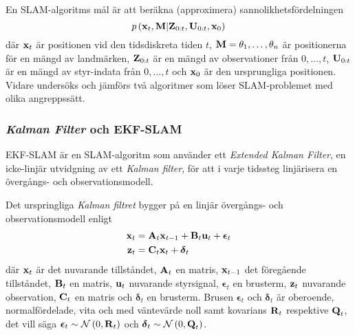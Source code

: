 \documentclass[11pt]{article}
\newcommand{\bfr}[1]{\textbf{\textrm{{#1}}}}
\begin{document}
\begin{flushleft}
En SLAM-algoritms mål är att beräkna (approximera) sannolikhetsfördelningen
\begin{equation*}
	p\left(\textbf{\textrm{x}}_{t},\textbf{\textrm{M}} \vert \textbf{\textrm{Z}}_{0:t}, \textbf{\textrm{U}}_{0:t}, \textbf{\textrm{x}}_0 \right)
\end{equation*}
där $\textbf{\textrm{x}}_t$ är positionen vid den tidsdiskreta tiden $t$, $\textbf{\textrm{M}}=\theta_1,\ldots,\theta_n$ är positionerna för en mängd av landmärken, $\textbf{\textrm{Z}}_{0:t}$ är en mängd av observationer från $0,\ldots,t$, $\textbf{\textrm{U}}_{0:t}$ är en mängd av styr-indata från $0,\ldots,t$ och $\textbf{\textrm{x}}_0$ är den ursprungliga positionen. Vidare undersöks och jämförs två algoritmer som löser SLAM-problemet med olika angreppssätt.   

\subsubsection{\emph{Kalman Filter} och EKF-SLAM}
EKF-SLAM är en SLAM-algoritm som använder ett \emph{Extended Kalman Filter}, en icke-linjär utvidgning av ett \emph{Kalman filter}, för att i varje tidssteg  linjärisera en övergångs- och observationsmodell.

Det urspringliga \emph{Kalman filtret} bygger på en linjär övergångs- och observationsmodell enligt
\begin{align*}
	\bfr{x}_t &= \bfr{A}_{t}\bfr{x}_{t-1} + \bfr{B}_{t}\bfr{u}_t + \boldsymbol{\epsilon}_t \\
	\bfr{z}_t &= \bfr{C}_{t}\bfr{x}_t + \boldsymbol{\delta}_t
\end{align*}
där $\bfr{x}_t$ är det nuvarande tillståndet, $\bfr{A}_t$ en matris, $\bfr{x}_{t-1}$ det föregående tillståndet, $\bfr{B}_t$ en matris, $\bfr{u}_t$ nuvarande styrsignal, $\boldsymbol{\epsilon}_t$ en brusterm, $\bfr{z}_t$ nuvarande observation, $\bfr{C}_t$ en matris och $\boldsymbol{\delta}_t$ en brusterm. Brusen $\boldsymbol{\epsilon}_t$ och $\boldsymbol{\delta}_t$ är oberoende, normalfördelade, vita och  med väntevärde noll samt kovarians $\bfr{R}_t$ respektive $\bfr{Q}_t$, det vill säga $\boldsymbol{\epsilon}_t \sim \mathcal{N}\left(0,\bfr{R}_t\right)$ och $\boldsymbol{\delta}_t \sim \mathcal{N}\left(0,\bfr{Q}_t\right)$.


\end{flushleft}
\end{document}
